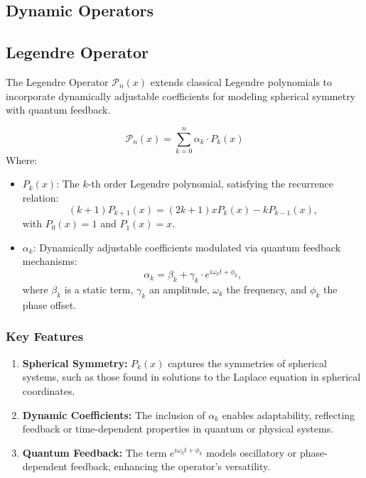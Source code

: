 \documentclass{article}
\theoremstyle{plain}
\begin{document}
\begin{itemize}
\section{Dynamic Operators}

\subsection{Legendre Operator}

The Legendre Operator \( \mathcal{P}_n(x) \) extends classical Legendre polynomials to incorporate dynamically adjustable coefficients for modeling spherical symmetry with quantum feedback.

\[
\mathcal{P}_n(x) = \sum_{k=0}^n \alpha_k \cdot P_k(x)
\]
Where:
\begin{itemize}
    \item \( P_k(x) \): The \( k \)-th order Legendre polynomial, satisfying the recurrence relation:
    \[
    (k+1) P_{k+1}(x) = (2k+1) x P_k(x) - k P_{k-1}(x),
    \]
    with \( P_0(x) = 1 \) and \( P_1(x) = x \).
    \item \( \alpha_k \): Dynamically adjustable coefficients modulated via quantum feedback mechanisms:
    \[
    \alpha_k = \beta_k + \gamma_k \cdot e^{i \omega_k t + \phi_k},
    \]
    where \( \beta_k \) is a static term, \( \gamma_k \) an amplitude, \( \omega_k \) the frequency, and \( \phi_k \) the phase offset.
\end{itemize}

\subsubsection*{Key Features}
\begin{enumerate}
    \item \textbf{Spherical Symmetry:} \( P_k(x) \) captures the symmetries of spherical systems, such as those found in solutions to the Laplace equation in spherical coordinates.
    \item \textbf{Dynamic Coefficients:} The inclusion of \( \alpha_k \) enables adaptability, reflecting feedback or time-dependent properties in quantum or physical systems.
    \item \textbf{Quantum Feedback:} The term \( e^{i \omega_k t + \phi_k} \) models oscillatory or phase-dependent feedback, enhancing the operator's versatility.
\end{enumerate}


\end{itemize}
\end{document}

